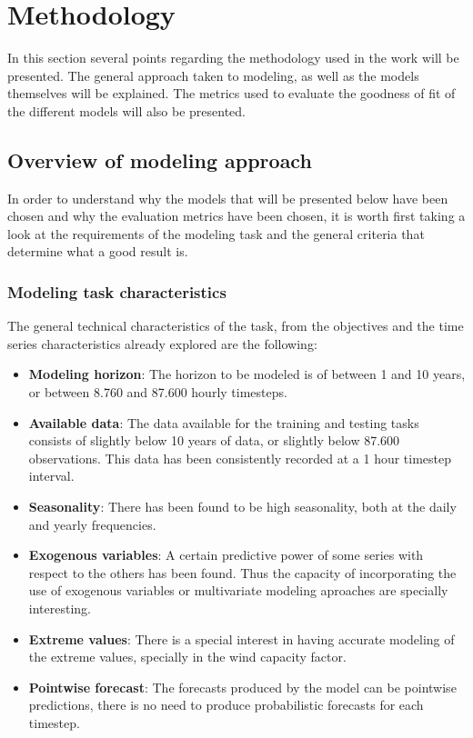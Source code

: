 \section{Methodology}
In this section several points regarding the methodology used in the work will be presented. The general approach taken to modeling, as well as the models themselves will be explained. The metrics used to evaluate the goodness of fit of the different models will also be presented. 

\subsection{Overview of modeling approach}
In order to understand why the models that will be presented below have been chosen and why the evaluation metrics have been chosen, it is worth first taking a look at the requirements of the modeling task and the general criteria that determine what a good result is.

\subsubsection{Modeling task characteristics}
The general technical characteristics of the task, from the objectives and the time series characteristics already explored are the following:
\begin{itemize}
    \item \textbf{Modeling horizon}: The horizon to be modeled is of between 1 and 10 years, or between 8.760 and 87.600 hourly timesteps. 
    \item \textbf{Available data}: The data available for the training and testing tasks consists of slightly below 10 years of data, or slightly below 87.600 observations. This data has been consistently recorded at a 1 hour timestep interval.
    \item \textbf{Seasonality}: There has been found to be high seasonality, both at the daily and yearly frequencies. 
    \item \textbf{Exogenous variables}: A certain predictive power of some series with respect to the others has been found. Thus the capacity of incorporating the use of exogenous variables or multivariate modeling aproaches are specially interesting. 
    \item \textbf{Extreme values}: There is a special interest in having accurate modeling of the extreme values, specially in the wind capacity factor.
    \item \textbf{Pointwise forecast}: The forecasts produced by the model can be pointwise predictions, there is no need to produce probabilistic forecasts for each timestep.
\end{itemize}

